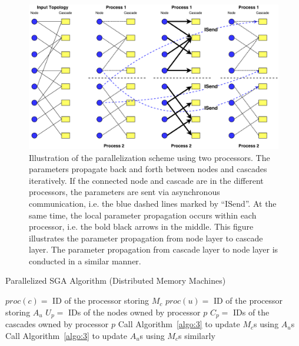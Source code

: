 \begin{figure}[t]
\includegraphics[width=.8\textwidth]{img/chap3/propagation_node_casc.pdf}
\centering
\caption{Illustration of the parallelization scheme using two processors. The parameters propagate back and forth between nodes and cascades iteratively. If the connected node and cascade are in the different processors, the parameters are sent via asynchronous communication, i.e. the blue dashed lines marked by ``ISend''. At the same time, the local parameter propagation occurs within each processor, i.e. the bold black arrows in the middle. This figure illustrates the parameter propagation from node layer to cascade layer. The parameter propagation from cascade layer to node layer is conducted in a similar manner.}\label{fig:pll}
\end{figure}
\begin{algorithm}
\caption{Parallelized SGA Algorithm (Distributed Memory Machines)}\label{algo:2}
\begin{algorithmic}[1]
\State $proc(c) = $ ID of the processor storing $M_c$
\EndFor
{}
\State $proc(u) = $ ID of the processor storing $A_u$
\EndFor
{}
\State $U_p = $ IDs of the nodes owned by processor $p$
\State $C_p = $ IDs of the cascades owned by processor $p$
\EndFor
{}
\State Call Algorithm~\ref{algo:3} to update $M_c$s using $A_u$s
\EndFor
{}
\State Call Algorithm~\ref{algo:3} to update $A_u$s using $M_c$s similarly
\EndFor
\EndFor
\end{algorithmic}
\end{algorithm}

